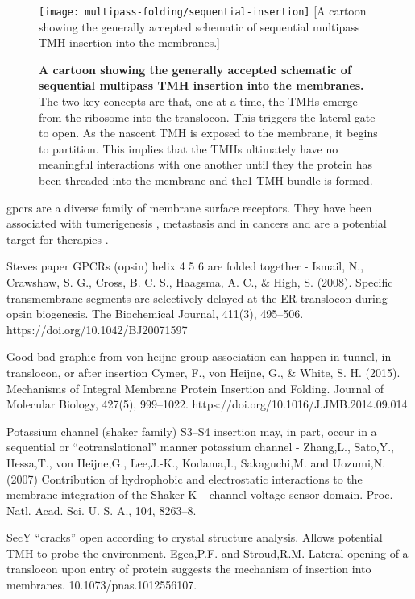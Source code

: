\begin{figure}[!ht]
\centering
\texttt{[image: multipass-folding/sequential-insertion]}
        [A cartoon showing the generally accepted schematic of sequential multipass TMH insertion into the membranes.]{\textbf{A cartoon showing the generally accepted schematic of sequential multipass TMH insertion into the membranes.}
        The two key concepts are that, one at a time, the TMHs emerge from the ribosome into the translocon.
        This triggers the lateral gate to open.
        As the nascent TMH is exposed to the membrane, it begins to partition.
        This implies that the TMHs ultimately have no meaningful interactions with one another until they the protein has been threaded into the membrane and the1 TMH bundle is formed.

}

\label{fig:sequential-insertion}
\end{figure}


\gls{gpcr}s are a diverse family of membrane surface receptors.
They have been associated with tumerigenesis \cite{OHayre2013}, metastasis \cite{Singh2015} and in cancers \cite{Bar-Shavit2016} and are a potential target for therapies \cite{Arakaki2018}.


Steves paper GPCRs (opsin) helix 4 5 6 are folded together - Ismail, N., Crawshaw, S. G., Cross, B. C. S., Haagsma, A. C., \& High, S. (2008). Specific transmembrane segments are selectively delayed at the ER translocon during opsin biogenesis. The Biochemical Journal, 411(3), 495–506. https://doi.org/10.1042/BJ20071597

Good\--bad graphic from von heijne group association can happen in tunnel, in translocon, or after insertion Cymer, F., von  Heijne, G., \& White, S. H. (2015). Mechanisms of Integral Membrane Protein Insertion and Folding. Journal of Molecular Biology, 427(5), 999–1022. https://doi.org/10.1016/J.JMB.2014.09.014

Potassium channel (shaker family) S3–S4 insertion may, in part, occur in a sequential or “cotranslational” manner potassium channel - Zhang,L., Sato,Y., Hessa,T., von Heijne,G., Lee,J.-K., Kodama,I., Sakaguchi,M. and Uozumi,N. (2007) Contribution of hydrophobic and electrostatic interactions to the membrane integration of the Shaker K+ channel voltage sensor domain. Proc. Natl. Acad. Sci. U. S. A., 104, 8263–8.

SecY “cracks” open according to crystal structure analysis. Allows potential TMH to probe the environment. Egea,P.F. and Stroud,R.M. Lateral opening of a translocon upon entry of protein suggests the mechanism of insertion into membranes. 10.1073/pnas.1012556107.

